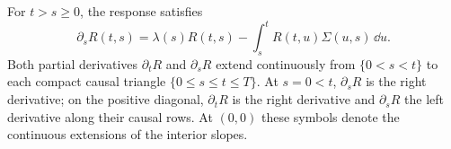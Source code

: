 \begin{proposition}\label{prop:backward-response}
For $t>s\ge0$, the response satisfies
\begin{equation}
\partial_sR(t,s)=\lambda(s)R(t,s)
                  -\int_s^tR(t,u)\Sigma(u,s)\,\dd u.
\label{eq:backward-response}
\end{equation}
Both partial derivatives $\partial_tR$ and $\partial_sR$ extend continuously from $\{0<s<t\}$ to each compact causal triangle $\{0\le s\le t\le T\}$. At $s=0<t$, $\partial_sR$ is the right derivative; on the positive diagonal, $\partial_tR$ is the right derivative and $\partial_sR$ the left derivative along their causal rows. At $(0,0)$ these symbols denote the continuous extensions of the interior slopes.
\end{proposition}

